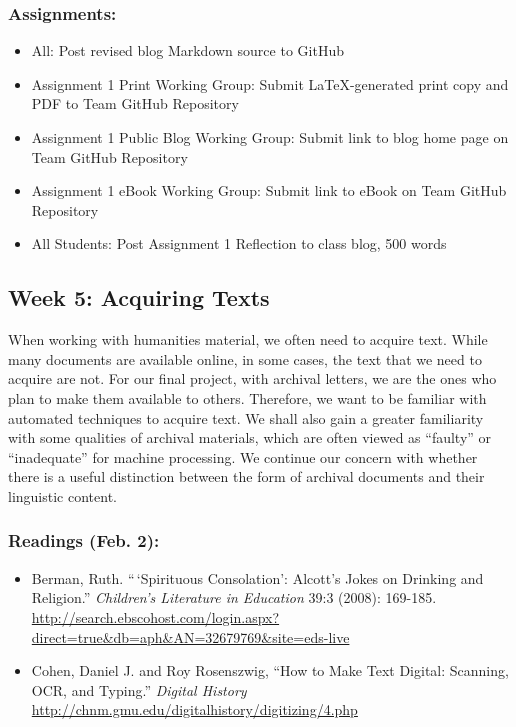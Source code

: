\documentclass[]{article}
\begin{document}
\subsubsection{Assignments:}\label{assignments}

\begin{itemize}
\itemsep1pt\parskip0pt
\item
  All: Post revised blog Markdown source to GitHub
\item
  Assignment 1 Print Working Group: Submit LaTeX-generated print copy
  and PDF to Team GitHub Repository
\item
  Assignment 1 Public Blog Working Group: Submit link to blog home page
  on Team GitHub Repository
\item
  Assignment 1 eBook Working Group: Submit link to eBook on Team GitHub
  Repository
\item
  All Students: Post Assignment 1 Reflection to class blog, 500 words
\end{itemize}

\subsection{Week 5: Acquiring Texts}\label{week-5-acquiring-texts}

When working with humanities material, we often need to acquire text.
While many documents are available online, in some cases, the text that
we need to acquire are not. For our final project, with archival
letters, we are the ones who plan to make them available to others.
Therefore, we want to be familiar with automated techniques to acquire
text. We shall also gain a greater familiarity with some qualities of
archival materials, which are often viewed as ``faulty'' or
``inadequate'' for machine processing. We continue our concern with
whether there is a useful distinction between the form of archival
documents and their linguistic content.

\subsubsection{Readings (Feb. 2):}\label{readings-feb.-2}

\begin{itemize}
\itemsep1pt\parskip0pt
\item
  Berman, Ruth. ``\,`Spirituous Consolation': Alcott's Jokes on Drinking
  and Religion.'' \emph{Children's Literature in Education} 39:3 (2008):
  169-185.
  \url{http://search.ebscohost.com/login.aspx?direct=true\&db=aph\&AN=32679769\&site=eds-live}
\item
  Cohen, Daniel J. and Roy Rosenszwig, ``How to Make Text Digital:
  Scanning, OCR, and Typing.'' \emph{Digital History}
  \url{http://chnm.gmu.edu/digitalhistory/digitizing/4.php}
\end{itemize}
\end{document}
